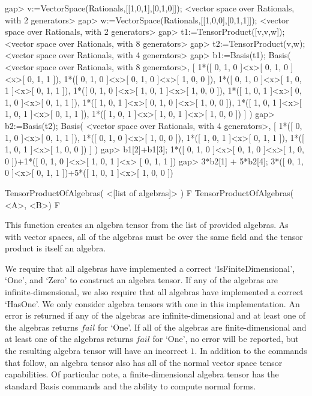 \beginexample
gap> v:=VectorSpace(Rationals,[[1,0,1],[0,1,0]]);
<vector space over Rationals, with 2 generators>
gap> w:=VectorSpace(Rationals,[[1,0,0],[0,1,1]]);
<vector space over Rationals, with 2 generators>
gap> t1:=TensorProduct([v,v,w]);
<vector space over Rationals, with 8 generators>
gap> t2:=TensorProduct(v,w);
<vector space over Rationals, with 4 generators>
gap> b1:=Basis(t1);
Basis( <vector space over Rationals, with 8 generators>,
[ 1*([ 0, 1, 0 ]<x>[ 0, 1, 0 ]<x>[ 0, 1, 1 ]),
  1*([ 0, 1, 0 ]<x>[ 0, 1, 0 ]<x>[ 1, 0, 0 ]),
  1*([ 0, 1, 0 ]<x>[ 1, 0, 1 ]<x>[ 0, 1, 1 ]),
  1*([ 0, 1, 0 ]<x>[ 1, 0, 1 ]<x>[ 1, 0, 0 ]),
  1*([ 1, 0, 1 ]<x>[ 0, 1, 0 ]<x>[ 0, 1, 1 ]),
  1*([ 1, 0, 1 ]<x>[ 0, 1, 0 ]<x>[ 1, 0, 0 ]),
  1*([ 1, 0, 1 ]<x>[ 1, 0, 1 ]<x>[ 0, 1, 1 ]),
  1*([ 1, 0, 1 ]<x>[ 1, 0, 1 ]<x>[ 1, 0, 0 ]) ] )
gap> b2:=Basis(t2);
Basis( <vector space over Rationals, with 4 generators>,
[ 1*([ 0, 1, 0 ]<x>[ 0, 1, 1 ]), 1*([ 0, 1, 0 ]<x>[ 1, 0, 0 ]),
  1*([ 1, 0, 1 ]<x>[ 0, 1, 1 ]), 1*([ 1, 0, 1 ]<x>[ 1, 0, 0 ]) ] )
gap> b1[2]+b1[3];
1*([ 0, 1, 0 ]<x>[ 0, 1, 0 ]<x>[ 1, 0, 0 ])+1*([ 0, 1, 0 ]<x>[ 1, 0, 1 ]<x>
[ 0, 1, 1 ])
gap> 3*b2[1] + 5*b2[4];
3*([ 0, 1, 0 ]<x>[ 0, 1, 1 ])+5*([ 1, 0, 1 ]<x>[ 1, 0, 0 ])
\endexample


\>TensorProductOfAlgebras( <[list of algebras]> ) F
\>TensorProductOfAlgebras( <A>, <B>) F

This function creates an algebra tensor from the list of provided algebras.
As with vector spaces, all of the algebras must be over the same field and the tensor product is itself an algebra.

We require that all algebras have implemented a correct `IsFiniteDimensional', `One', and `Zero' to construct an algebra 
tensor.
If any of the algebras are infinite-dimensional, we also require that all algebras have implemented a correct `HasOne'.
We only consider algebra tensors with one in this implementation.
An error is returned if any of the algebras are infinite-dimensional and at least one of the algebras returns $fail$ for `One'.
If all of the algebras are finite-dimensional and at least one of the algebras returns $fail$ for `One', no error will be reported, 
but the resulting algebra tensor will have an incorrect $1$.
In addition to the commands that follow, an algebra tensor also has all of the normal vector space tensor capabilities.
Of particular note, a finite-dimensional algebra tensor has the standard Basis commands and the ability to compute normal forms.

